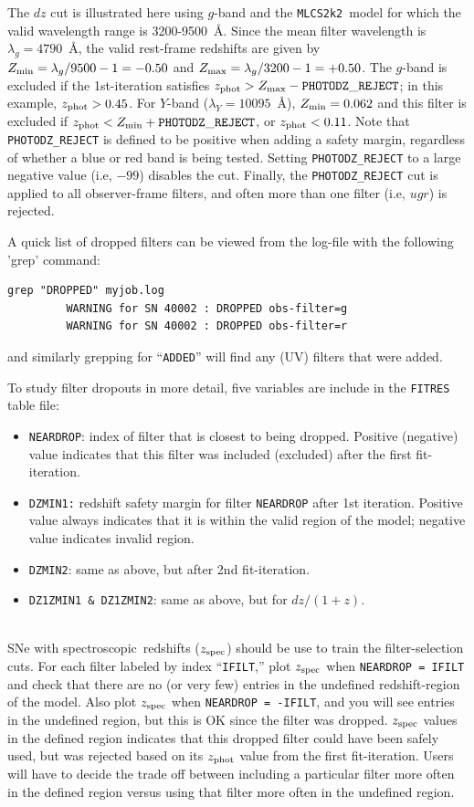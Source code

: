 \documentclass[12pt]{article}
\newcommand{\mlcs}{{\tt MLCS2k2}}
\newcommand{\Zphot}{z_{\rm phot}}
\newcommand{\Zspec}{z_{\rm spec}}
\newcommand{\spec}{spectroscopic}
\newcommand{\lamg}{\lambda_g}
\newcommand{\lamY}{\lambda_Y}
\newcommand{\zmin}{Z_{\rm min}}
\newcommand{\zmax}{Z_{\rm max}}
\begin{document}
The $dz$ cut is illustrated here using $g$-band and the \mlcs\
model for which the valid wavelength range is 3200-9500~\AA.
Since the mean filter wavelength is $\lamg = 4790$~\AA,
the valid rest-frame redshifts are given by
$\zmin = \lamg/9500 -1 = -0.50$ and
$\zmax = \lamg/3200 -1 = +0.50$.
The $g$-band is excluded if the 1st-iteration satisfies
$\Zphot > \zmax - {\tt PHOTODZ\_REJECT}$;
in this example, $\Zphot > 0.45$.
For $Y$-band ($\lamY = 10095$~\AA), $\zmin = 0.062$
and this filter is excluded if $\Zphot < \zmin + {\tt PHOTODZ\_REJECT}$,
or $\Zphot < 0.11$.
Note that \verb|PHOTODZ_REJECT| is defined to be positive when adding a 
safety margin, regardless of whether a blue or red band is being tested.
Setting  \verb|PHOTODZ_REJECT| to a large negative value (i.e, $-99$)
disables the cut.
Finally, the \verb|PHOTODZ_REJECT| cut is applied to all observer-frame
filters, and often more than one filter (i.e, $ugr$) is rejected.


A quick list of dropped filters can be viewed from the log-file
with the following 'grep' command:
\begin{Verbatim}[frame=single]
   grep "DROPPED" myjob.log
         WARNING for SN 40002 : DROPPED obs-filter=g
         WARNING for SN 40002 : DROPPED obs-filter=r
\end{Verbatim}
%
and similarly grepping for ``{\tt ADDED}'' will find any 
(UV) filters that were added.

To study filter dropouts in more detail, 
five variables are include in the {\tt FITRES} table file:
\begin{itemize}
  \item {\tt NEARDROP}: index of filter that is closest
        to being dropped. Positive (negative) value indicates
        that this filter was included (excluded) after the 
        first fit-iteration.
%
  \item {\tt DZMIN1:} redshift safety margin for filter {\tt NEARDROP}
        after 1st iteration.
        Positive value always indicates that it is within the
	valid region of the model; negative value indicates
	invalid region.
%
 \item  {\tt DZMIN2}: same as above, but after 2nd fit-iteration.
%
  \item {\tt DZ1ZMIN1 \& DZ1ZMIN2}: same as above, but for $dz/(1+z)$.
\end{itemize}

\bigskip
{} \\
SNe with \spec\ redshifts ($\Zspec$) should be use to train 
the filter-selection cuts.
For each filter labeled by index ``{\tt IFILT},''
plot $\Zspec$ when {\tt NEARDROP = IFILT} and check
that there are no (or very few) entries in the undefined
redshift-region of the model.  
Also plot $\Zspec$ when {\tt NEARDROP = -IFILT},
and you will see entries in the undefined region,
but this is OK since the filter was dropped.
$\Zspec$ values in the defined region indicates that
this dropped filter could have been safely used,
but was rejected based on its $\Zphot$ value from the
first fit-iteration. Users will have to decide the
trade off between including a particular filter more 
often in the defined region versus using that filter
more often in the undefined region.
\end{document}
